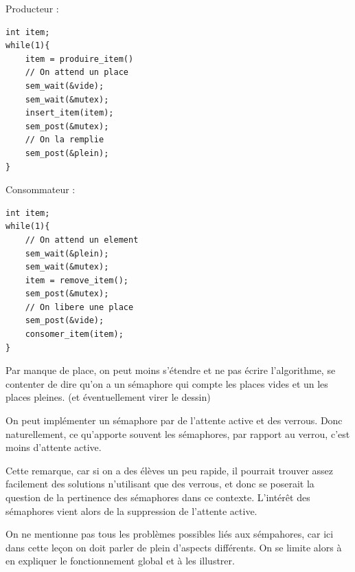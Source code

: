 \begin{appl}
\begin{minipage}{0.45\textwidth}
		Producteur :
		\begin{lstlisting}[style=Cstyle]
int item;
while(1){
	item = produire_item()
	// On attend un place
	sem_wait(&vide);
	sem_wait(&mutex);
	insert_item(item);
	sem_post(&mutex);
	// On la remplie
	sem_post(&plein);
}\end{lstlisting}
	\end{minipage}\qquad
	\begin{minipage}{0.45\textwidth}
		Consommateur :
		\begin{lstlisting}[style=Cstyle]
int item;
while(1){
	// On attend un element
	sem_wait(&plein);
	sem_wait(&mutex);
	item = remove_item();
	sem_post(&mutex);
	// On libere une place
	sem_post(&vide);
	consomer_item(item);
}\end{lstlisting}
	\end{minipage}
	
\end{appl}

\begin{com}
	Par manque de place, on peut moins s'étendre et ne pas écrire l'algorithme, se contenter de dire qu'on a un sémaphore qui compte les places vides et un les places pleines. (et éventuellement virer le dessin)
\end{com}

\begin{rem}
	On peut implémenter un sémaphore par de l'attente active et des verrous. Donc naturellement, ce qu'apporte souvent les sémaphores, par rapport au verrou, c'est moins d'attente active.
\end{rem}

\begin{com}
	Cette remarque, car si on a des élèves un peu rapide, il pourrait trouver assez facilement des solutions n'utilisant que des verrous, et donc se poserait la question de la pertinence des sémaphores dans ce contexte. L'intérêt des sémaphores vient alors de la suppression de l'attente active.
\end{com}

\begin{com}
	On ne mentionne pas tous les problèmes possibles liés aux sémpahores, car ici dans cette leçon on doit parler de plein d'aspects différents. On se limite alors à en expliquer le fonctionnement global et à les illustrer.
\end{com}